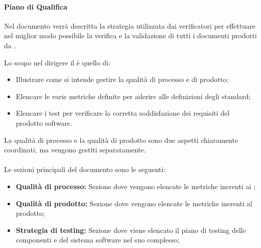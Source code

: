 \paragraph{Piano di Qualifica}
Nel documento \PdQ{} verrà descritta la strategia utilizzata dai verificatori per effettuare nel miglior modo possibile la verifica e la validazione di tutti i documenti prodotti da \Gruppo{}.

Lo scopo nel dirigere il \PdQ{} è quello di:
\begin{itemize}
	\item Illustrare come si intende gestire la qualità di processo e di prodotto;
	\item Elencare le varie metriche definite per aderire alle definizioni degli standard;
	\item Elencare i test per verificare la corretta soddisfazione dei requisiti del prodotto software.
\end{itemize}

La qualità di processo e la qualità di prodotto sono due aspetti chiaramente coordinati, ma vengono gestiti separatamente. \\ \\
Le sezioni principali del documento sono le seguenti:
\begin{itemize}
    \item \textbf{Qualità di processo:} Sezione dove vengono elencate le metriche inerenti ai ;
    \item \textbf{Qualità di prodotto:} Sezione dove vengono elencate le metriche inerenti al prodotto;
    \item \textbf{Strategia di testing:} Sezione dove viene elencato il piano di testing delle componenti e del sistema software nel suo complesso;
\end{itemize}
